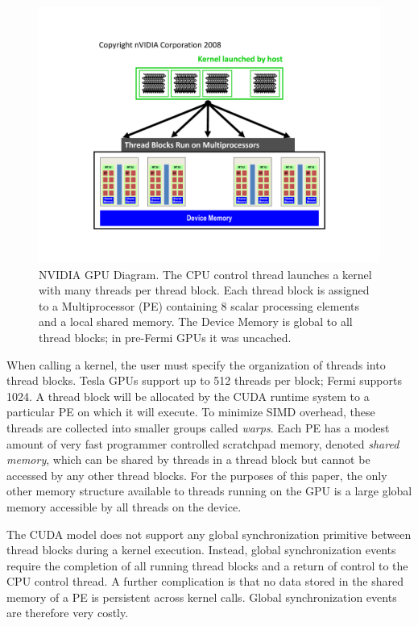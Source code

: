 \documentclass{sig-alternate}
\begin{document}
\begin{figure}
\includegraphics[width=\columnwidth]{figures/CUDADiagram}
\caption{NVIDIA GPU Diagram.  The CPU control thread launches a kernel with
  many threads per thread block.  Each thread block is assigned to a
  Multiprocessor (PE) containing 8 scalar processing elements and a local
  shared memory.  The Device Memory is global to all thread blocks; in
  pre-Fermi GPUs it was uncached.}
\label{fig:CUDAOrg}
\end{figure}

When calling a kernel, the user must specify the organization of threads into
thread blocks.  Tesla GPUs support up to 512 threads per block; Fermi
supports 1024.  A thread block will be allocated by the CUDA runtime system
to a particular PE on which it will execute.  To minimize SIMD overhead,
these threads are collected into smaller groups called {\em warps}.  Each PE
has a modest amount of very fast programmer controlled scratchpad memory,
denoted {\em shared memory}, which can be shared by threads in a thread block
but cannot be accessed by any other thread blocks.  For the purposes of this
paper, the only other memory structure available to threads running on the
GPU is a large global memory accessible by all threads on the device.

The CUDA model does not support any global synchronization primitive between
thread blocks during a kernel execution.  Instead, global synchronization
events require the completion of all running thread blocks and a return of
control to the CPU control thread.  A further complication is that no data
stored in the shared memory of a PE is persistent across kernel calls.
Global synchronization events are therefore very costly.
\end{document}
